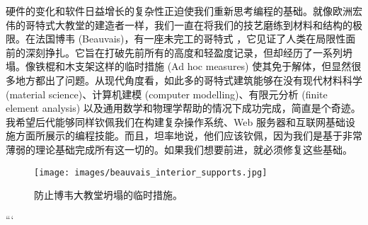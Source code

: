 硬件的变化和软件日益增长的复杂性正迫使我们重新思考编程的基础。就像欧洲宏伟的哥特式大教堂的建造者一样，我们一直在将我们的技艺磨练到材料和结构的极限。在法国博韦 (Beauvais)，有一座未完工的哥特式 ，它见证了人类在局限性面前的深刻挣扎。它旨在打破先前所有的高度和轻盈度记录，但却经历了一系列坍塌。像铁棍和木支架这样的临时措施 (Ad hoc measures) 使其免于解体，但显然很多地方都出了问题。从现代角度看，如此多的哥特式建筑能够在没有现代材料科学 (material science)、计算机建模 (computer modelling)、有限元分析 (finite element analysis) 以及通用数学和物理学帮助的情况下成功完成，简直是个奇迹。我希望后代能够同样钦佩我们在构建复杂操作系统、Web 服务器和互联网基础设施方面所展示的编程技能。而且，坦率地说，他们应该钦佩，因为我们是基于非常薄弱的理论基础完成所有这一切的。如果我们想要前进，就必须修复这些基础。

\begin{figure}
  \centering
  \texttt{[image: images/beauvais\_interior\_supports.jpg]}
  \caption{防止博韦大教堂坍塌的临时措施。}
\end{figure}
```